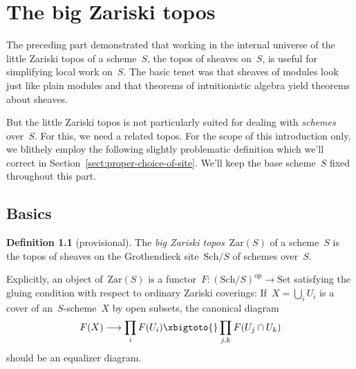 \documentclass[10pt,reqno,a4paper]{amsbook}
\theoremstyle{definition}
\newtheorem{defn}{Definition}[section]
\theoremstyle{plain}
\theoremstyle{remark}
\newcommand{\Set}{\mathrm{Set}}
\newcommand{\Zar}{\mathrm{Zar}}
\newcommand{\Sch}{\mathrm{Sch}}
\newcommand{\op}{\mathrm{op}}
\newcommand{\?}{\,{:}\,}
\renewcommand{\_}{\mathpunct{.}\,}
\begin{document}
\chapter{The big Zariski topos}\label{part:big-zariski}

The preceding part demonstrated that working in the internal universe of
the little Zariski topos of a scheme~$S$, the topos of sheaves on~$S$, is
useful for simplifying local work on~$S$. The basic tenet was that sheaves of
modules look just like plain modules and that theorems of intuitionistic
algebra yield theorems about sheaves.

But the little Zariski topos is not particularly suited for dealing with
\emph{schemes} over~$S$. For this, we need a related topos. For the scope of
this introduction only, we blithely employ the following slightly problematic
definition which we'll correct in Section~\ref{sect:proper-choice-of-site}.
We'll keep the base scheme~$S$ fixed throughout this part.


\section{Basics}

\begin{defn}[provisional]The \emph{big Zariski topos}~$\Zar(S)$ of a scheme~$S$ is the
topos of sheaves on the Grothendieck site~$\Sch/S$ of schemes over~$S$.
\end{defn}

Explicitly, an object of~$\Zar(S)$ is a functor~$F : (\Sch/S)^\op \to \Set$
satisfying the gluing condition with respect to ordinary Zariski coverings:
If~$X = \bigcup_i U_i$ is a cover of an~$S$-scheme~$X$ by open subsets, the
canonical diagram
\[ F(X) \longrightarrow \prod_i F(U_i) \xbigtoto{} \prod_{j,k} F(U_j \cap U_k)
\]
should be an equalizer diagram.
\end{document}
